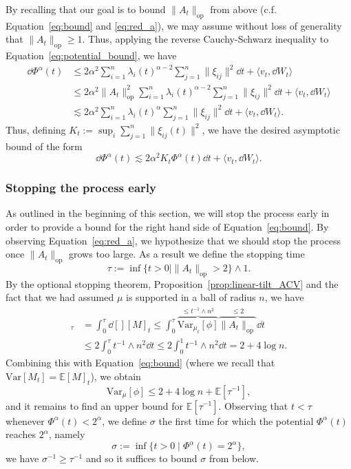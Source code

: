 By recalling that our goal is to bound \(\|A_t\|_{\text{op}}\) from above (c.f. Equation~\eqref{eq:bound} and \eqref{eq:red_a}), 
we may assume without loss of generality that \(\|A_t\|_{\text{op}} \ge 1\). Thus, applying the reverse Cauchy-Schwarz inequality to 
Equation~\eqref{eq:potential_bound}, we have
\begin{align*}
  \dd \Phi^\alpha(t) & \le 2\alpha^2 \sum_{i = 1}^n \lambda_i(t)^{\alpha - 2} \sum_{j = 1}^n \|\xi_{ij}\|^2 \dd t + \langle v_t, \dd W_t\rangle\\
    & \le 2\alpha^2 \|A_t\|_{\text{op}}^2 \sum_{i = 1}^n \lambda_i(t)^{\alpha - 2} \sum_{j = 1}^n \|\xi_{ij}\|^2 \dd t + \langle v_t, \dd W_t\rangle\\
    & \lesssim 2\alpha^2\sum_{i = 1}^n \lambda_i(t)^\alpha \sum_{j = 1}^n \|\xi_{ij}\|^2 \dd t + \langle v_t, \dd W_t\rangle.
\end{align*} 
Thus, defining \(K_t := \sup_i \sum_{j = 1}^n \|\xi_{ij}(t)\|^2\), we have the desired asymptotic bound of the form
\begin{equation}\label{eq:potential_bound_2}
  \dd \Phi^\alpha(t) \lesssim 2\alpha^2 K_t \Phi^\alpha(t) \dd t + \langle v_t, \dd W_t\rangle.
\end{equation}

\subsubsection{Stopping the process early}

As outlined in the beginning of this section, we will stop the process early in order to provide a 
bound for the right hand side of Equation~\eqref{eq:bound}. By observing Equation~\eqref{eq:red_a}, we hypothesize that
we should stop the process once \(\|A_t\|_{\text{op}}\) grows too large. As a result we define the stopping time 
\[\tau := \inf\{t > 0 \mid \|A_t\|_{\text{op}} > 2\} \wedge 1.\]
By the optional stopping theorem, Proposition~\ref{prop:linear-tilt_ACV} and the fact that we had assumed 
\(\mu\) is supported in a ball of radius \(n\), we have
\begin{align*}
  [M]_\tau & = \int_0^\tau \dd[] [M]_t 
      \le \int_0^\tau \overbrace{\text{Var}_{\mu_t}[\phi]}^{\le t^{-1} \wedge n^2} \overbrace{\|A_t\|_{\text{op}}}^{\le 2} \dd t\\
    & \le 2 \int_0^\tau t^{-1} \wedge n^2 \dd t \le 2 \int_0^1 t^{-1} \wedge n^2 \dd t = 2 + 4 \log n.
\end{align*}
Combining this with Equation~\eqref{eq:bound} (where we recall that \(\text{Var}[M_t] = \mathbb{E}[M]_t\)),  we obtain
\begin{equation}\label{eq:tau_bd}
  \text{Var}_\mu[\phi] \le 2 + 4 \log n + \mathbb{E}[\tau^{-1}],
\end{equation}
and it remains to find an upper bound for \(\mathbb{E}[\tau^{-1}]\). Observing that \(t < \tau\) whenever 
\(\Phi^\alpha(t) < 2^\alpha\), we define \(\sigma\) the first time for which the potential \(\Phi^\alpha(t)\) reaches \(2^\alpha\),
namely
\[\sigma := \inf \{t > 0 \mid \Phi^\alpha(t) = 2^\alpha\},\] 
we have \(\sigma^{-1} \ge \tau^{-1}\) and so it suffices to bound \(\sigma\) from below. 

